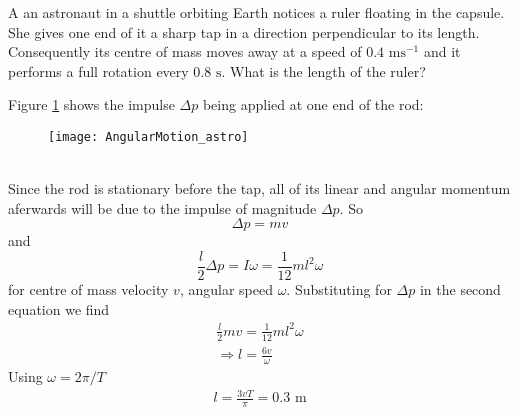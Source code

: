 \begin{problem}
{A an astronaut in a shuttle orbiting Earth notices a ruler floating in the capsule. She gives one end of it a sharp tap in a direction perpendicular to its length. Consequently its centre of mass moves away at a speed of $0.4\textrm{ ms}^{-1}$ and it performs a full rotation every $0.8\textrm{ s}$. What is the length of the ruler? }
{%
}
{
Figure \ref{fig:AngularMotion_astro} shows the impulse $\Delta p$ being applied at one end of the rod:
\begin{figure}[h]
\centering
\texttt{[image: AngularMotion\_astro]}
\caption{}
\label{fig:AngularMotion_astro}
\end{figure}
\\
Since the rod is stationary before the tap, all of its linear and angular momentum aferwards will be due to the impulse of magnitude $\Delta p$. So 
\begin{equation*}
\Delta p=mv
\end{equation*}
and
\begin{equation*}
\frac{l}{2}\Delta p=I\omega=\frac{1}{12}ml^2\omega
\end{equation*}
for centre of mass velocity $v$, angular speed $\omega$. Substituting for $\Delta p$ in the second equation we find
\begin{align*}
\frac{l}{2}mv=\frac{1}{12}ml^2\omega \\
\Rightarrow l=\frac{6v}{\omega}
\end{align*}
Using $\omega=2\pi/T$
\begin{align*}
l=\frac{3vT}{\pi}=0.3\textrm{ m}
\end{align*}
}
\end{problem}